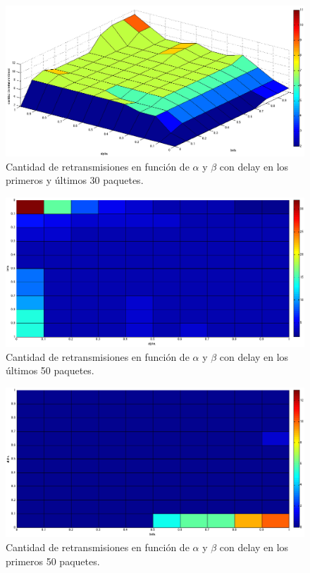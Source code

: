 \documentclass[10pt, a4paper]{article}
\begin{document}
\begin{figure}[H]
\begin{center}
\includegraphics[width=17cm]{delay-30I-ret.png}
\caption{Cantidad de retransmisiones en función de $\alpha$ y $\beta$ con delay en los primeros y últimos 30 paquetes.}
\end{center}
\end{figure}


\begin{figure}[H]
\begin{center}
\includegraphics[width=17cm]{delay-50F-ret-costado.png}
\caption{Cantidad de retransmisiones en función de $\alpha$ y $\beta$ con delay en los últimos 50 paquetes.}
\end{center}
\end{figure}

\begin{figure}[H]
\begin{center}
\includegraphics[width=17cm]{delay-50L-ret-costado.png}
\caption{Cantidad de retransmisiones en función de $\alpha$ y $\beta$ con delay en los primeros 50 paquetes.}
\end{center}
\end{figure}
\end{document}
